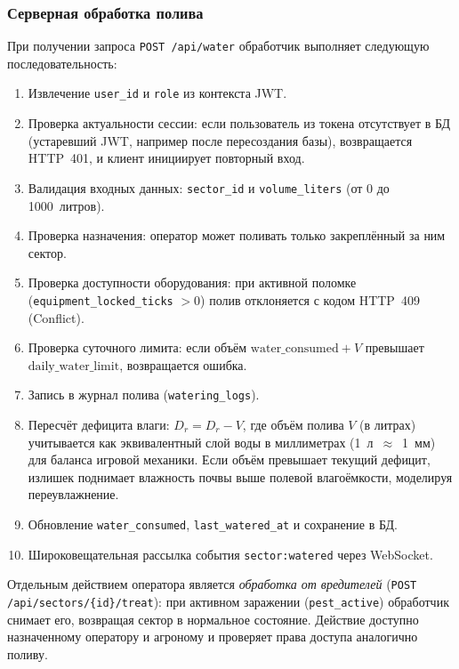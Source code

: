 \subsubsection{Серверная обработка полива}

При получении запроса \texttt{POST /api/water} обработчик
выполняет следующую последовательность:
\begin{enumerate}
    \item Извлечение \texttt{user\_id} и \texttt{role} из
    контекста JWT.
    \item Проверка актуальности сессии: если пользователь из
    токена отсутствует в БД (устаревший JWT, например после
    пересоздания базы), возвращается HTTP~401, и клиент
    инициирует повторный вход.
    \item Валидация входных данных: \texttt{sector\_id} и
    \texttt{volume\_liters} (от 0 до 1000~литров).
    \item Проверка назначения: оператор может поливать
    только закреплённый за ним сектор.
    \item Проверка доступности оборудования: при активной
    поломке (\texttt{equipment\_locked\_ticks} $> 0$) полив
    отклоняется с кодом HTTP~409 (Conflict).
    \item Проверка суточного лимита: если объём
    \(\text{water\_consumed} + V\) превышает
    \(\text{daily\_water\_limit}\), возвращается ошибка.
    \item Запись в журнал полива (\texttt{watering\_logs}).
    \item Пересчёт дефицита влаги: $D_r = D_r - V$, где
    объём полива $V$ (в литрах) учитывается как эквивалентный
    слой воды в миллиметрах (1~л~$\approx$~1~мм) для баланса
    игровой механики. Если объём превышает текущий дефицит,
    излишек поднимает влажность почвы выше полевой влагоёмкости,
    моделируя переувлажнение.
    \item Обновление \texttt{water\_consumed},
    \texttt{last\_watered\_at} и сохранение в БД.
    \item Широковещательная рассылка события
    \texttt{sector:watered} через WebSocket.
\end{enumerate}

Отдельным действием оператора является \emph{обработка от
вредителей} (\texttt{POST /api/sectors/\{id\}/treat}): при
активном заражении (\texttt{pest\_active}) обработчик снимает
его, возвращая сектор в нормальное состояние. Действие
доступно назначенному оператору и агроному и проверяет права
доступа аналогично поливу.

